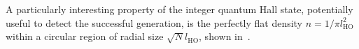 A particularly interesting property of the integer quantum Hall state, potentially useful to detect the successful generation, is the perfectly flat density $n=1/\pi l_\text{HO}^2$ within a circular region of radial size $\sqrt{N}l_\text{HO}$, shown in~.







